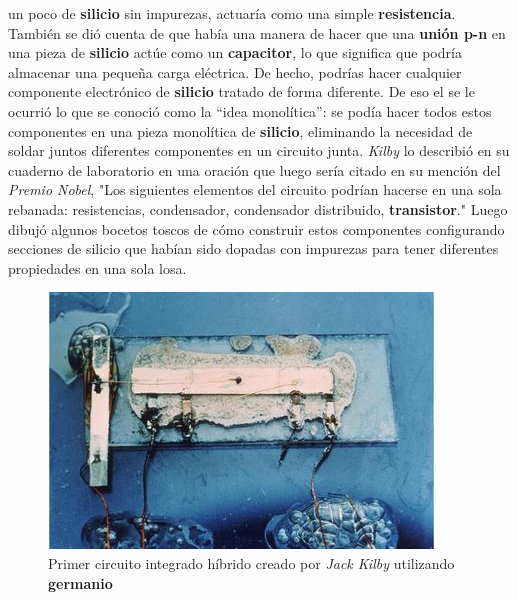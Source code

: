un poco de \textbf{silicio} sin impurezas, actuaría como una simple \textbf{resistencia}. También se dió cuenta de que había una manera de hacer
que una \textbf{unión p-n} en una pieza de \textbf {silicio} actúe como un \textbf{capacitor}, lo que significa que podría almacenar una pequeña
carga eléctrica. De hecho, podrías hacer cualquier componente electrónico de \textbf{silicio} tratado de forma diferente. De eso el se le ocurrió
lo que se conoció como la “idea monolítica”: se podía hacer todos estos componentes en una pieza monolítica de \textbf{silicio}, eliminando la
necesidad de soldar juntos diferentes componentes en un circuito junta. \emph{Kilby} lo describió en su cuaderno de laboratorio en una oración
que luego sería citado en su mención del \emph {Premio Nobel}, "Los siguientes elementos del circuito podrían hacerse en una sola rebanada:
resistencias, condensador, condensador distribuido, \textbf{transistor}." Luego dibujó algunos bocetos toscos de cómo construir estos componentes
configurando secciones de silicio que habían sido dopadas con impurezas para tener diferentes propiedades en una sola losa. \\  

\begin{figure}[htb]
	\centering
	\includegraphics[scale = 0.8]{Graphics/kilby_first_microchip.jpg}
	\caption{Primer circuito integrado híbrido creado por \emph{Jack Kilby} utilizando \textbf{germanio}}
	\label{fig:7}
\end{figure}

